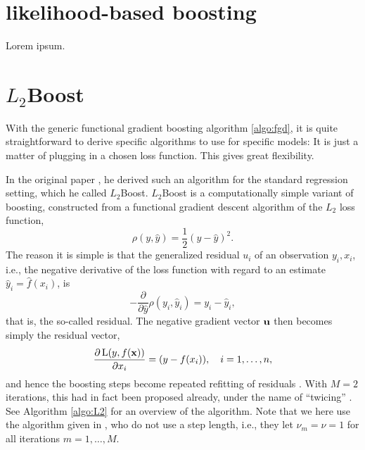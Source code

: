 \section{likelihood-based boosting}
Lorem ipsum. \citep{DeBin2016}

\section{$L_2$Boost}
With the generic functional gradient boosting algorithm \eqref{algo:fgd}, it is quite straightforward to derive specific algorithms to use for specific models: It is just a matter of plugging in a chosen loss function. This gives great flexibility.

In the original paper \citep{friedman2001}, he derived such an algorithm for the standard regression setting, which he called $L_2$Boost. $L_2$Boost is a computationally simple variant of boosting, constructed from a functional gradient descent algorithm of the $L_2$ loss function,
\begin{equation*}
    \rho(y, \hat{y})=\frac{1}{2}(y-\hat{y})^2.
\end{equation*}
The reason it is simple is that the generalized residual $u_i$ of an observation $y_i,x_i$, i.e., the negative derivative of the loss function with regard to an estimate $\hat{y}_i=\hat{f}(x_i)$, is
\begin{equation*}
    -\frac{\partial}{\partial\hat{y}}\rho(y_i, \hat{y}_i)=y_i-\hat{y}_i,
\end{equation*}
that is, the so-called residual. The negative gradient vector $\mathbf{u}$ then becomes simply the residual vector,
\begin{equation*}
    \frac{\partial\operatorname{L}(y,f(\mathbf{x}))}{\partial x_i}=(y-f(x_i)),\quad i=1,\dotsc,n,
\end{equation*}
and hence the boosting steps become repeated refitting of residuals \citep{friedman2001,buhlmann-yu}. With $M=2$ iterations, this had in fact been proposed already, under the name of ``twicing'' \citep{tukey}. See Algorithm \ref{algo:L2} for an overview of the algorithm. Note that we here use the algorithm given in \citet{buhlmann-yu}, who do not use a step length, i.e., they let $\nu_m=\nu=1$ for all iterations $m=1,\ldots,M$.
